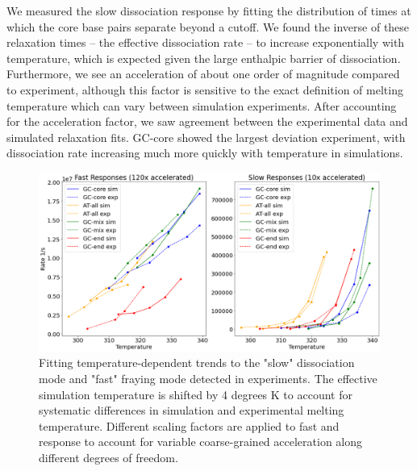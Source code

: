 \documentclass[journal=jpcbfk,manuscript=article]{achemso}
\begin{document}
We measured the slow dissociation response by fitting the distribution of times at which the core base pairs separate beyond a cutoff. We found the inverse of these relaxation times -- the effective dissociation rate -- to increase exponentially with temperature, which is expected given the large enthalpic barrier of dissociation. Furthermore, we see an acceleration of about one order of magnitude compared to experiment, although this factor is sensitive to the exact definition of melting temperature which can vary between simulation experiments. After accounting for the acceleration factor, we saw agreement between the experimental data and simulated relaxation fits. GC-core showed the largest deviation experiment, with dissociation rate increasing much more quickly with temperature in simulations.


\begin{figure}  %
	\begin{center}
        \includegraphics[width=\textwidth]{Figs/figs_imp/Tjump_responses.png}
        \caption{Fitting temperature-dependent trends to the "slow" dissociation mode and "fast" fraying mode detected in experiments. The effective simulation temperature is shifted by 4 degrees K to account for systematic differences in simulation and experimental melting temperature. Different scaling factors are applied to fast and response to account for variable coarse-grained acceleration along different degrees of freedom.}
        \label{fig:relaxation-comparison}
	\end{center}
\end{figure}
\end{document}
